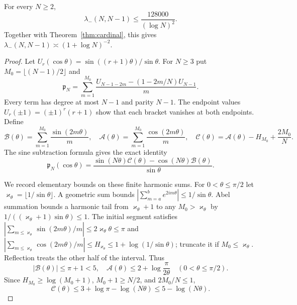 \documentclass{siamart251216}
\begin{document}
\begin{theorem}\label{thm:harmonic}%
For every $N\ge2$,
\begin{equation}\label{eq:harmonic-result}
 \lambda_-(N,N-1)\le\frac{128000}{(\log N)^2}.
\end{equation}
Together with Theorem~\ref{thm:cardinal}, this gives
$\lambda_-(N,N-1)\asymp(1+\log N)^{-2}$.
\end{theorem}
\begin{proof}
Let $U_r(\cos\theta)=\sin((r+1)\theta)/\sin\theta$.
For $N\ge3$ put $M_0=\lfloor(N-1)/2\rfloor$ and
\begin{equation}\label{eq:witness}
 \mathfrak p_N=\sum_{m=1}^{M_0}\frac{
 U_{N-1-2m}-(1-2m/N)U_{N-1}}m.
\end{equation}
Every term has degree at most $N-1$ and parity $N-1$.
The endpoint values $U_r(\pm1)=(\pm1)^r(r+1)$ show that each
bracket vanishes at both endpoints. Define
\[
 \mathcal B(\theta)=\sum_{m=1}^{M_0}\frac{\sin(2m\theta)}m,\quad
 \mathcal A(\theta)=\sum_{m=1}^{M_0}\frac{\cos(2m\theta)}m,\quad
 \mathcal C(\theta)=\mathcal A(\theta)-H_{M_0}+\frac{2M_0}{N}.
\]
The sine subtraction formula gives the exact identity
\begin{equation}\label{eq:witness-identity}
 \mathfrak p_N(\cos\theta)=
 \frac{\sin(N\theta)\mathcal C(\theta)-\cos(N\theta)\mathcal B(\theta)}{\sin\theta}.
\end{equation}

We record elementary bounds on these finite harmonic sums.
For $0<\theta\le\pi/2$ let $\varkappa_\theta=\lfloor1/\sin\theta\rfloor$.
A geometric sum bounds
$|\sum_{m=a}^b e^{2im\theta}|\le1/\sin\theta$.
Abel summation bounds a harmonic tail from $\varkappa_\theta+1$ to any $M_0>\varkappa_\theta$
by $1/((\varkappa_\theta+1)\sin\theta)\le1$.
The initial segment satisfies
$|\sum_{m\le\varkappa_\theta}\sin(2m\theta)/m|\le2\varkappa_\theta\theta\le\pi$
and $|\sum_{m\le\varkappa_\theta}\cos(2m\theta)/m|\le H_{\varkappa_\theta}
\le1+\log(1/\sin\theta)$; truncate it if $M_0\le\varkappa_\theta$.
Reflection treats the other half of the interval. Thus
\begin{equation}\label{eq:harmonic-bounds}
 |\mathcal B(\theta)|\le\pi+1<5,
 \quad \mathcal A(\theta)\le2+\log\frac{\pi}{2\theta}
 \quad(0<\theta\le\pi/2).
\end{equation}
Since $H_{M_0}\ge\log(M_0+1)$, $M_0+1\ge N/2$, and $2M_0/N\le1$,
\begin{equation}\label{eq:Cbound}
 \mathcal C(\theta)\le3+\log\pi-\log(N\theta)
              \le5-\log(N\theta).
\end{equation}


\end{proof}
\end{document}
